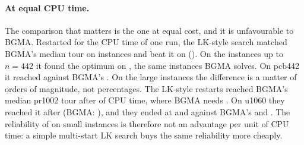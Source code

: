 \paragraph{At equal CPU time.}
The comparison that matters is the one at equal cost, and it is unfavourable to BGMA. Restarted for
the CPU time of one  run, the LK-style search matched BGMA's median tour on
 instances and beat it on  ().  On the  instances up to $n=442$ it found the optimum on
, the same instances BGMA solves. On pcb442 it reached  against
BGMA's . On the large instances the difference is a matter of orders of
magnitude, not percentages. The LK-style restarts reached BGMA's median pr1002 tour after
 of CPU time, where BGMA needs . On u1060 they reached it
after  (BGMA: ), and they ended at  and
 against BGMA's  and . The reliability of
 on small instances is therefore not an advantage per unit of CPU time: a simple
multi-start LK search buys the same reliability more cheaply.
